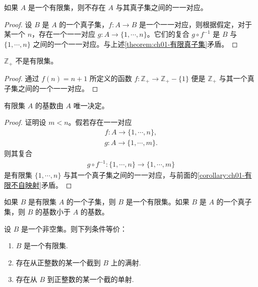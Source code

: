 \documentclass[../../main.tex]{subfiles}
\begin{document}
\begin{corollary}\label{corollary:ch01-有限不自映射}
如果 $A$ 是一个有限集，则不存在 $A$ 与其真子集之间的一一对应。
\end{corollary}

\begin{proof}
设 $B$ 是 $A$ 的一个真子集，$f: A \longrightarrow B$ 是一个一一对应，则根据假定，对于某一个 $n$，存在一个一一对应 $g: A \longrightarrow \{1, \cdots, n\}$。它们的复合 $g \circ f^{-1}$ 是 $B$ 与 $\{1, \cdots, n\}$ 之间的一个一一对应。与上述\cref{theorem:ch01-有限真子集}矛盾。
\end{proof}

\begin{corollary}\label{corollary:ch01-Z无限}
$\mathbb{Z}_{+}$ 不是有限集。
\end{corollary}

\begin{proof}
通过 $f(n) = n+1$ 所定义的函数 $f: \mathbb{Z}_{+} \longrightarrow \mathbb{Z}_{+} - \{1\}$ 便是 $\mathbb{Z}_{+}$ 与其一个真子集之间的一个一一对应。
\end{proof}

\begin{corollary}\label{corollary:ch01-基数唯一}
有限集 $A$ 的基数由 $A$ 唯一决定。
\end{corollary}

\begin{proof}
证明设 $m < n$。假若存在一一对应
\begin{align*}
f: A \longrightarrow \{1, \cdots, n\},
\end{align*}
\begin{align*}
g: A \longrightarrow \{1, \cdots, m\}.
\end{align*}
则其复合
\begin{align*}
g \circ f^{-1}: \{1, \cdots, n\} \longrightarrow \{1, \cdots, m\}
\end{align*}
是有限集 $\{1, \cdots, n\}$ 与其一个真子集之间的一一对应，与前面的\cref{corollary:ch01-有限不自映射}矛盾。
\end{proof}

\begin{corollary}\label{corollary:ch01-有限子集}
如果 $B$ 是有限集 $A$ 的一个子集，则 $B$ 是一个有限集。如果 $B$ 是 $A$ 的一个真子集，则 $B$ 的基数小于 $A$ 的基数。
\end{corollary}

\begin{corollary}\label{corollary:ch01-有限等价条件}
设 $B$ 是一个非空集。则下列条件等价：
\begin{enumerate}[(1)]
\item $B$ 是一个有限集.
\item 存在从正整数的某一个截到 $B$ 上的满射.
\item 存在从 $B$ 到正整数的某一个截的单射.
\end{enumerate}
\end{corollary}
\end{document}
